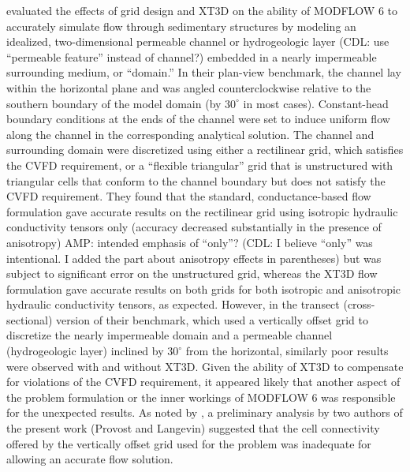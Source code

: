 \documentclass{article}
\begin{document}
\cite{bardot2022} evaluated the effects of grid design and XT3D on the ability of MODFLOW 6 to accurately simulate flow through sedimentary structures by modeling an idealized, two-dimensional permeable channel or hydrogeologic layer {\color{red} (CDL: use ``permeable feature'' instead of channel?)} embedded in a nearly impermeable surrounding medium, or ``domain.'' In their plan-view benchmark, the channel lay within the horizontal plane and was angled counterclockwise relative to the southern boundary of the model domain (by $30^{\circ}$ in most cases). Constant-head boundary conditions at the ends of the channel were set to induce uniform flow along the channel in the corresponding analytical solution. The channel and surrounding domain were discretized using either a rectilinear grid, which satisfies the CVFD requirement, or a ``flexible triangular'' grid that is unstructured with triangular cells that conform to the channel boundary but does not satisfy the CVFD requirement. They found that the standard, conductance-based flow formulation gave accurate results on the rectilinear grid using isotropic hydraulic conductivity tensors only (accuracy decreased substantially in the presence of anisotropy) {\color{red} AMP: intended emphasis of ``only''? (CDL: I believe ``only'' was intentional.  I added the part about anisotropy effects in parentheses)} but was subject to significant error on the unstructured grid, whereas the XT3D flow formulation gave accurate results on both grids for both isotropic and anisotropic hydraulic conductivity tensors, as expected. However, in the transect (cross-sectional) version of their benchmark, which used a vertically offset grid to discretize the nearly impermeable domain and a permeable channel (hydrogeologic layer) inclined by $30^{\circ}$ from the horizontal, similarly poor results were observed with and without XT3D. Given the ability of XT3D to compensate for violations of the CVFD requirement, it appeared likely that another aspect of the problem formulation or the inner workings of MODFLOW 6 was responsible for the unexpected results.  As noted by \cite{bardot2022}, a preliminary analysis by two authors of the present work (Provost and Langevin) suggested that the cell connectivity offered by the vertically offset grid used for the problem was inadequate for allowing an accurate flow solution.
\end{document}
